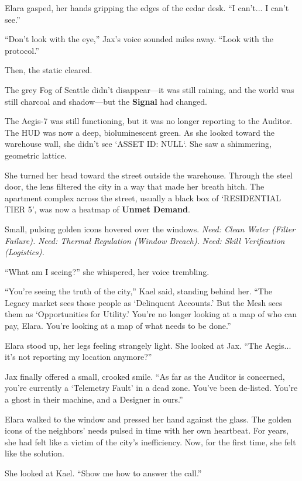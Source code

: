 Elara gasped, her hands gripping the edges of the cedar desk. ``I can't... I can't see.''

``Don't look with the eye,'' Jax’s voice sounded miles away. ``Look with the protocol.''

Then, the static cleared. 

The grey Fog of Seattle didn't disappear—it was still raining, and the world was still charcoal and shadow—but the \textbf{Signal} had changed. 

The Aegis-7 was still functioning, but it was no longer reporting to the Auditor. The HUD was now a deep, bioluminescent green. As she looked toward the warehouse wall, she didn't see `ASSET ID: NULL`. She saw a shimmering, geometric lattice.


She turned her head toward the street outside the warehouse. Through the steel door, the lens filtered the city in a way that made her breath hitch. The apartment complex across the street, usually a black box of `RESIDENTIAL TIER 5', was now a heatmap of \textbf{Unmet Demand}.

Small, pulsing golden icons hovered over the windows. 
\textit{Need: Clean Water (Filter Failure).}
\textit{Need: Thermal Regulation (Window Breach).}
\textit{Need: Skill Verification (Logistics).}

``What am I seeing?'' she whispered, her voice trembling. 

``You’re seeing the truth of the city,'' Kael said, standing behind her. ``The Legacy market sees those people as `Delinquent Accounts.' But the Mesh sees them as `Opportunities for Utility.' You’re no longer looking at a map of who can pay, Elara. You’re looking at a map of what needs to be done.''



Elara stood up, her legs feeling strangely light. She looked at Jax. ``The Aegis... it’s not reporting my location anymore?''

Jax finally offered a small, crooked smile. ``As far as the Auditor is concerned, you’re currently a `Telemetry Fault' in a dead zone. You’ve been de-listed. You’re a ghost in their machine, and a Designer in ours.''

Elara walked to the window and pressed her hand against the glass. The golden icons of the neighbors' needs pulsed in time with her own heartbeat. For years, she had felt like a victim of the city’s inefficiency. Now, for the first time, she felt like the solution.

She looked at Kael. ``Show me how to answer the call.''

